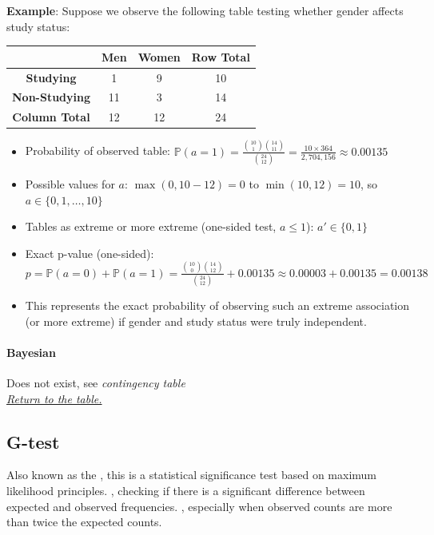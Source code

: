 \textbf{Example}: Suppose we observe the following table testing whether gender affects study status:
\begin{center}
    \begin{tabular}{|*{4}{c|}}
    \hline
    & \textbf{Men} & \textbf{Women} & \textbf{Row Total}\\
    \hline
    \textbf{Studying} & 1 & 9 & 10 \\
    \hline
    \textbf{Non-Studying} & 11 & 3 & 14 \\
    \hline
    \textbf{Column Total} & 12 & 12 & 24 \\
    \hline
    \end{tabular}
\end{center}
\begin{itemize}
    \item Probability of observed table: $\mathbb{P}(a=1) = \frac{\binom{10}{1}\binom{14}{11}}{\binom{24}{12}} = \frac{10 \times 364}{2{,}704{,}156} \approx 0.00135$
    \item Possible values for $a$: $\max(0, 10-12) = 0$ to $\min(10, 12) = 10$, so $a \in \{0,1,\ldots,10\}$
    \item Tables as extreme or more extreme (one-sided test, $a \leq 1$): $a' \in \{0, 1\}$
    \item Exact p-value (one-sided): $p = \mathbb{P}(a=0) + \mathbb{P}(a=1) = \frac{\binom{10}{0}\binom{14}{12}}{\binom{24}{12}} + 0.00135 \approx 0.00003 + 0.00135 = 0.00138$
    \item This represents the exact probability of observing such an extreme association (or more extreme)
        if gender and study status were truly independent.
\end{itemize}

\paragraph{Bayesian}
Does not exist, see \emph{contingency table} \\

\textit{\hyperref[statistical_method_table]{Return to the table.}}


\subsection{G-test}

Also known as the , this is a statistical significance
test based on maximum likelihood principles. , checking if there is a significant difference between
expected and observed frequencies. , especially when observed counts are
more than twice the expected counts.

